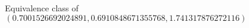 \documentclass[preview]{standalone}
\begin{document}
\begin{center}
Equivalence class of $(0.7001526692024891, 0.6910848671355768, 1.741317876272116)$
\end{center}
\end{document}
